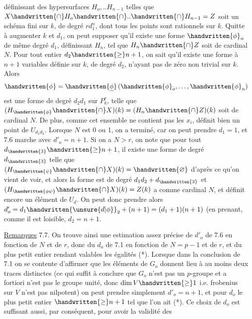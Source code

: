 définissant des hypersurfaces $H_o,..H_{n-1}$ telles que $X\handwritten{\cap}H_o\handwritten{\cap}..\handwritten{\cap}H_{n-1}=Z$ soit un schéma fini  sur $k$, de degré $rd_1^n$, dont tous les points sont rationnels sur $k$. Quitte à augmenter $k$ et $d_1$, on peut supposer qu'il existe une forme $\handwritten{\phi}_n$ de même degré $d_1$, définissant $H_n$, tel que $H_n\handwritten{\cap}Z$ soit de cardinal $N$. Pour tout entier $d_2\handwritten{\geq}n+1$, on sait qu'il existe une forme \handwritten{$\underline{\phi}$} à $n+1$ variables  définie sur $k$, de degré $d_2$,  n'ayant pas de zéro non trivial sur $k$. Alors
\[
\handwritten{\phi}=\handwritten{\underline{\phi}}\,(\handwritten{\phi}_o,\ldots,\handwritten{\phi}_n)
\]
est une forme de degré $d_2d_1$ sur $P^r_k$, telle que $(H_{\handwritten{\phi}}\handwritten{\cap}X)(k)=(H_n\handwritten{\cap}Z)(k)$ soit de cardinal $N$. De plus, comme cet ensemble ne contient pas les $x_i$, \handwritten{$\phi$} définit bien un point de $U_{d_1d_2}$. Lorsque $N$ est 0 ou 1, on a terminé, car on peut prendre $d_1=1$, et 7.6 marche avec $d'_o=n+1$. Si on a $N>r$, on note que pour tout $d_{\handwritten{3}}\handwritten{\geq}n+1$, il existe une forme \handwritten{$\unsure{\psi|\mu}$} de degré $d_{\handwritten{3}}$  telle que $(H_{\handwritten{\psi}}\handwritten{\cap}X)(k)=\handwritten{\varnothing}$ d'après ce qu'on vient de voir, et alors la forme \handwritten{$\phi\ \psi$} est de degré  $d_1d_2+d_{\handwritten{3}}$ et $(H_{\handwritten{\phi\psi}}\handwritten{\cap}X)(k)=Z(k)$ a comme cardinal $N$, et \handwritten{$\phi\psi$} définit encore un élément de $U_d$. On peut donc prendre alors $d'_o=d_1\handwritten{\unsure{d|\phi}}_2+(n+1)=(d_1+1)(n+1)$ (en prenant, comme il est loisible, $d_2=n+1$.

\uline{Remarques} 7.7.  On trouve ainsi une estimation assez précise de $d'_o$ de 7.6  en fonction de $N$ et de $r$, donc du $d_o$ de 7.1 en fonction de $N=p-1$ et de $r$,  et du plus petit entier rendant valables les égalités (*). Lorsque dans la conclusion de 7.1 on se contente d'affirmer que les éléments de $G_o$ donnent lieu à au moins deux traces distinctes (ce qui suffit à conclure que $G_o$ n'est pas un $p$-groupe et a fortiori n'est pas le groupe unité, donc $\dim V\handwritten{\geq}1$ i.e. frobenius sur $V$ n'est pas nilpotent) on peut prendre  simplement $d'_o=n+1$, et pour $d_o$ le plus petit entier $\handwritten{\geq}n+1$ tel que l'on ait (*). Ce choix de $d_o$ est suffisant aussi, par conséquent, pour avoir la validité des
